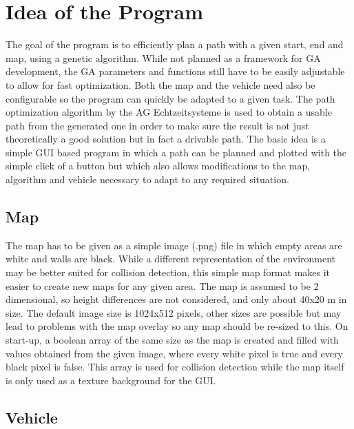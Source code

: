 \chapter{Idea of the Program}
\label{cha:program_idea}

The goal of the program is to efficiently plan a path with a given start, end and map, using a genetic algorithm. While not planned as a framework for GA development, the GA parameters and functions still have to be easily adjustable to allow for fast optimization. Both the map and the vehicle need also be configurable so the program can quickly be adapted to a given task. The path optimization algorithm by the AG Echtzeitsysteme is used to obtain a usable path from the generated one in order to make sure the result is not just theoretically a good solution but in fact a drivable path.
The basic idea is a simple GUI based program in which a path can be planned and plotted with the simple click of a button but which also allows modifications to the map, algorithm and vehicle necessary to adapt to any required situation.

\section{Map}
\label{sec:map}

The map has to be given as a simple image (.png) file in which empty areas are white and walls are black. While a different representation of the environment may be better suited for collision detection, this simple map format makes it easier to create new maps for any given area. The map is assumed to be 2 dimensional, so height differences are not considered, and only about 40x20 m in size. The default image size is 1024x512 pixels, other sizes are possible but may lead to problems with the map overlay so any map should be re-sized to this. On start-up, a boolean array of the same size as the map is created and filled with values obtained from the given image, where every white pixel is true and every black pixel is false. This array is used for collision detection while the map itself is only used as a texture background for the GUI.

\section{Vehicle}
\label{sec:vehicle}

